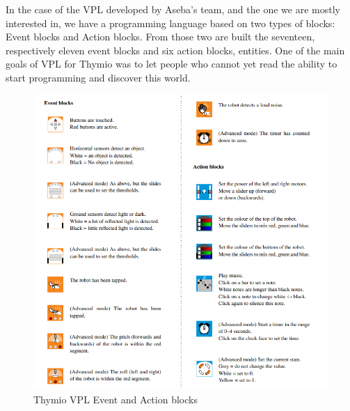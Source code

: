 \documentclass{scrartcl}
\begin{document}
In the case of the VPL developed by Aseba’s team, and the one we are mostly interested in, we have a programming language based on two types of blocks: Event blocks and Action blocks. 
From those two are built the seventeen, respectively eleven event blocks and six action blocks, entities. 
One of the main goals of VPL for Thymio was to let people who cannot yet read the ability to start programming and discover this world.

\begin{figure}[h!]
  \includegraphics[width=\textwidth]{Thymio_blocks}
  \caption{Thymio VPL Event and Action blocks}
  \label{fig:thymio_vpl_blocks}
\end{figure}
\end{document}
